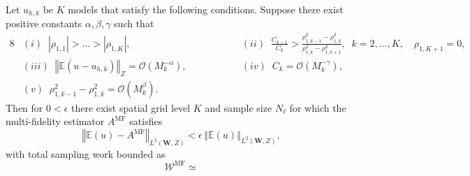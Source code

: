







\begin{theorem}
\label{thm:Sample_cost_est}
Let $u_{h,k}$ be $K$ models that satisfy the following conditions.
Suppose there exist positive constants $\alpha, \beta, \gamma$ such that
%
\begin{alignat*}{8}
    &(i)\;\; |\rho_{1,1}|>\ldots>|\rho_{1,K}|,& \qquad \qquad
    &(ii)\;\; \frac{C_{k-1}}{C_k}>\frac{\rho_{1,k-1}^2-\rho_{1,k}^2}{\rho_{1,k}^2-\rho_{1,k+1}^2},\;\;k=2,\ldots,K, \quad \rho_{1,K+1}=0,\\
    &(iii)\;\; \left\Vert\mathbb{E}\left(u-u_{h,k}\right)\right\Vert_Z=\mathcal{O}\left( M_k^{-\alpha}\right),& \qquad \qquad
    &(iv)\;\; C_k=\mathcal{O}\left( M_k^{-\gamma}\right),\\
    &(v)\;\; \rho_{1,k-1}^2-\rho_{1,k}^2=\mathcal{O}\left( M_k^{\beta}\right).
\end{alignat*}
%
%
Then for $0<\epsilon$ there exist spatial grid level $K$ and sample size $N_\ell$ for which the multi-fidelity estimator $A^{\text{MF}}$ satisfies
\[
\left\Vert\mathbb{E}(u)-A^{\text{MF}} \right\Vert_{L^2(\boldsymbol W,Z)}<\epsilon\,\left\Vert\mathbb{E}(u) \right\Vert_{L^2( \boldsymbol W,Z)},
\]
with total sampling work bounded as
\begin{equation*}
    \mathcal{W}^{\text{MF}} \simeq 
\end{equation*}
\end{theorem}
